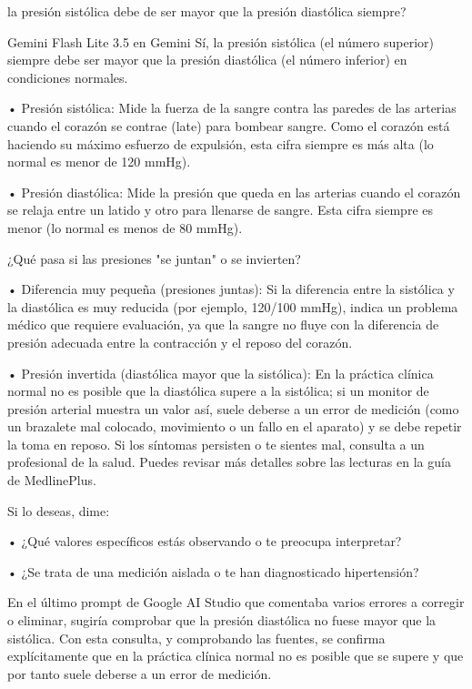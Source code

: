\documentclass[12pt,a4paper,oneside]{book}
\begin{document}
\begin{iaprompt}
la presión sistólica debe de ser mayor que la presión diastólica siempre?
\end{iaprompt}
\begin{iaresp}{Gemini Flash Lite 3.5 en Gemini}
Sí, la presión sistólica (el número superior) siempre debe ser mayor que la presión diastólica (el número inferior) en condiciones normales.

• Presión sistólica: Mide la fuerza de la sangre contra las paredes de las arterias cuando el corazón se contrae (late) para bombear sangre. Como el corazón está haciendo su máximo esfuerzo de expulsión, esta cifra siempre es más alta (lo normal es menor de 120 mmHg).

• Presión diastólica: Mide la presión que queda en las arterias cuando el corazón se relaja entre un latido y otro para llenarse de sangre. Esta cifra siempre es menor (lo normal es menos de 80 mmHg).

¿Qué pasa si las presiones "se juntan" o se invierten?

• Diferencia muy pequeña (presiones juntas): Si la diferencia entre la sistólica y la diastólica es muy reducida (por ejemplo, 120/100 mmHg), indica un problema médico que requiere evaluación, ya que la sangre no fluye con la diferencia de presión adecuada entre la contracción y el reposo del corazón.

• Presión invertida (diastólica mayor que la sistólica): En la práctica clínica normal no es posible que la diastólica supere a la sistólica; si un monitor de presión arterial muestra un valor así, suele deberse a un error de medición (como un brazalete mal colocado, movimiento o un fallo en el aparato) y se debe repetir la toma en reposo. Si los síntomas persisten o te sientes mal, consulta a un profesional de la salud. Puedes revisar más detalles sobre las lecturas en la guía de MedlinePlus.

Si lo deseas, dime:

• ¿Qué valores específicos estás observando o te preocupa interpretar?

• ¿Se trata de una medición aislada o te han diagnosticado hipertensión?
\end{iaresp}
\begin{iaanalisis}
En el último prompt de Google AI Studio que comentaba varios errores a corregir o eliminar, sugiría comprobar que la presión diastólica no fuese mayor que la sistólica. Con esta consulta, y comprobando las fuentes, se confirma explícitamente que en la práctica clínica normal no es posible que se supere y que por tanto suele deberse a un error de medición.
\end{iaanalisis}
\end{document}
